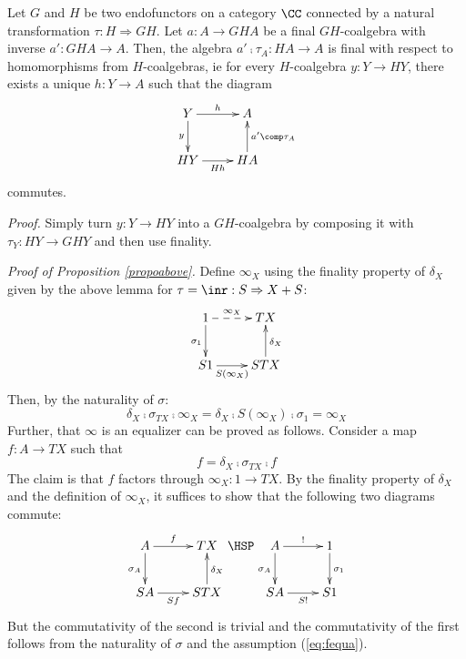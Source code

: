 \documentclass[11pt,a4paper]{article}
\newcommand{\contr}{\sigma}
\newcommand{\esse}{S}
\begin{document}
\begin{lemma}
Let $G$ and $H$ be two endofunctors on a category $\CC$
connected by a natural transformation $\tau : H\Rightarrow GH$.
Let $a : A\rightarrow GHA$ be a final $GH$-coalgebra with inverse
$a ' :GHA \rightarrow A$.
Then, the algebra $a ' \comp \tau_A : HA \rightarrow A$
is final with respect to homomorphisms from $H$-coalgebras,
ie
for every $H$-coalgebra $y: Y \rightarrow HY$,
there exists a unique $h: Y \rightarrow A$ 
such that the diagram
$$\xymatrix{
Y \ar[r]^-{h}  \ar[d]_-{y} & A
\\
HY \ar[r]_-{Hh} & HA \ar[u]_-{a '\comp \tau_A} 
}$$
commutes.

\emph{Proof.} Simply turn $y : Y \rightarrow HY$
into a $GH$-coalgebra by composing it
with $\tau_Y : HY \rightarrow GHY$
and then use finality.
\close

\end{lemma}

\emph{Proof of Proposition \ref{propoabove}.}
Define $\infty_X$ using the finality property of $\delta_X$
given by the above lemma for $\tau =\inr : \esse \Rightarrow X+ \esse$:
$$\xymatrix{
1 \ar@{-->}[r]^-{\infty_X}  \ar[d]_{\contr_1} & TX
\\
\esse 1 \ar[r]_-{\esse (\infty_X )} & {\esse TX} \ar[u]_{\delta_X} 
}$$
Then, by the naturality of $\contr$:
$$\delta_X \comp \contr_{TX} \comp \infty_X 
  = \delta_X \comp \esse (\infty_X) \comp \contr_1
  = \infty_X
$$
Further, that $\infty$ is an equalizer can 
be proved as follows.
Consider a map $f: A \rightarrow TX$ such that
\begin{equation}
  \label{eq:fequa}
  f = \delta_X \comp \contr_{TX} \comp f
\end{equation}
The claim is that $f$ factors through $\infty_X : 1\rightarrow TX$.
By the finality property of $\delta_X$ and the definition of $\infty_X$,
it suffices to show that the following two diagrams commute:
$$\xymatrix{
A \ar[r]^-{f}  \ar[d]_{\contr_A} & TX
\\
\esse A \ar[r]_-{\esse f} & {\esse TX} \ar[u]_{\delta_X} 
}
\HSP
\xymatrix{
A \ar[r]^-{!}  \ar[d]_{\contr_A} & 1 \ar[d]^{\contr_1}
\\
\esse A \ar[r]_-{\esse !} & {\esse 1} 
}
$$
But the commutativity of the second is trivial
and the commutativity of the first follows from
the naturality of $\contr$ and the assumption (\ref{eq:fequa}).
\close
\end{document}
